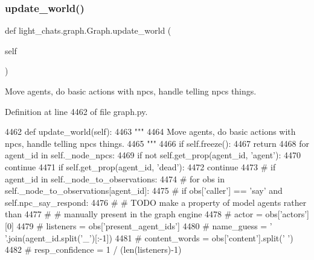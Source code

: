 \subsubsection{\texorpdfstring{update\+\_\+world()}{update\_world()}}
{\footnotesize\ttfamily def light\+\_\+chats.\+graph.\+Graph.\+update\+\_\+world (\begin{DoxyParamCaption}\item[{}]{self }\end{DoxyParamCaption})}

\begin{DoxyVerb}Move agents, do basic actions with npcs, handle telling npcs things.
\end{DoxyVerb}
 

Definition at line 4462 of file graph.\+py.


\begin{DoxyCode}
4462     \textcolor{keyword}{def }update\_world(self):
4463         \textcolor{stringliteral}{"""}
4464 \textcolor{stringliteral}{        Move agents, do basic actions with npcs, handle telling npcs things.}
4465 \textcolor{stringliteral}{        """}
4466         \textcolor{keywordflow}{if} self.freeze():
4467             \textcolor{keywordflow}{return}
4468         \textcolor{keywordflow}{for} agent\_id \textcolor{keywordflow}{in} self.\_node\_npcs:
4469             \textcolor{keywordflow}{if} \textcolor{keywordflow}{not} self.get\_prop(agent\_id, \textcolor{stringliteral}{'agent'}):
4470                 \textcolor{keywordflow}{continue}
4471             \textcolor{keywordflow}{if} self.get\_prop(agent\_id, \textcolor{stringliteral}{'dead'}):
4472                 \textcolor{keywordflow}{continue}
4473             \textcolor{comment}{# if agent\_id in self.\_node\_to\_observations:}
4474             \textcolor{comment}{#     for obs in self.\_node\_to\_observations[agent\_id]:}
4475             \textcolor{comment}{#         if obs['caller'] == 'say' and self.npc\_say\_respond:}
4476             \textcolor{comment}{#             # TODO make a property of model agents rather than}
4477             \textcolor{comment}{#             # manually present in the graph engine}
4478             \textcolor{comment}{#             actor = obs['actors'][0]}
4479             \textcolor{comment}{#             listeners = obs['present\_agent\_ids']}
4480             \textcolor{comment}{#             name\_guess = ' '.join(agent\_id.split('\_')[:-1])}
4481             \textcolor{comment}{#             content\_words = obs['content'].split(' ')}
4482             \textcolor{comment}{#             resp\_confidence = 1 / (len(listeners)-1)}

\end{DoxyCode}
